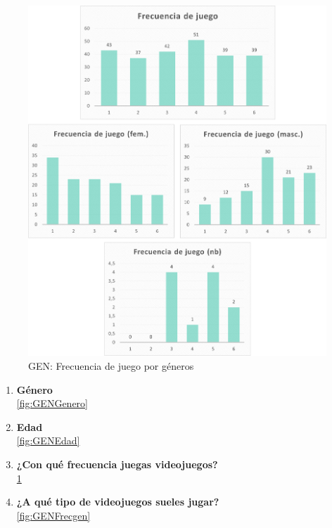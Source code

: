 \documentclass[12pt, a4paper,twoside,titlepage]{book}
\begin{document}
\begin{figure}
	\centering
	\includegraphics[width=1\linewidth]{ANEXO Gen/3AnexGENFrecALL}
	\caption{GEN: Frecuencia de juego por géneros}
	\label{fig:GENFrec}
\end{figure}


\begin{enumerate}[label=\textbf{\arabic*}.]
     \item \textbf{Género}\\
     \ref{fig:GENGenero}
     \item \textbf{Edad }\\
     \ref{fig:GENEdad}
     \item \textbf{¿Con qué frecuencia juegas videojuegos?}\\
     \ref{fig:GENFrec}
     \item \textbf{¿A qué tipo de videojuegos sueles jugar? }\\
     \ref{fig:GENFrecgen}
\end{enumerate}
\end{document}
